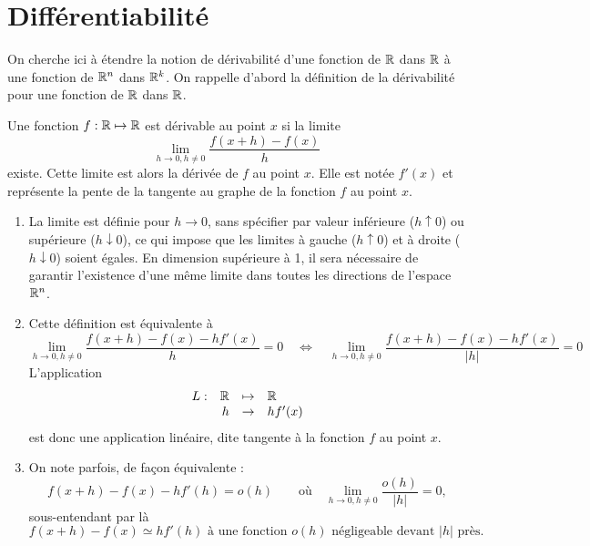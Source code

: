 \section{Différentiabilité} \label{sec:Multivar-Diff}


On cherche ici à étendre la notion de dérivabilité d'une fonction de $\mathbb{R}$ dans $\mathbb{R}$ à une fonction de $\mathbb{R}^n$ dans $\mathbb{R}^k$. On rappelle d'abord la définition de la dérivabilité pour une fonction de $\mathbb{R}$ dans $\mathbb{R}$.

\begin{definition*}[Dérivabilité]
  Une fonction $f: \mathbb{R} \mapsto \mathbb{R}$ est dérivable au point $x$ si la limite
  $$
  \lim_{h \rightarrow 0, h \neq 0} \frac{f(x+h) - f(x)}{h}
  $$
  existe. Cette limite est alors la dérivée de $f$ au point $x$. Elle est notée $f'(x)$ et représente la pente de la tangente au graphe de la fonction $f$ au point $x$.
\end{definition*}

\remark
\begin{enumerate}
  \item La limite est définie pour $h \rightarrow 0$, sans spécifier par valeur inférieure ($h \uparrow 0$) ou supérieure ($h \downarrow 0$), ce qui impose que les limites à gauche ($h \uparrow 0$) et à droite ($h \downarrow 0$) soient égales. En dimension supérieure à 1, il sera nécessaire de garantir l'existence d'une même limite dans toutes les directions de l'espace $\mathbb{R}^n$.
  \item Cette définition est équivalente à
  $$
  \lim_{h\rightarrow 0, h \neq 0} \frac{f(x+h) - f(x) - hf'(x)}{h} = 0
  \quad \Leftrightarrow \quad 
  \lim_{h\rightarrow 0, h \neq 0} \frac{f(x+h) - f(x) - hf'(x)}{|h|} = 0
  $$
  L'application 
  $$
  \begin{array}{rrcl}
    L :  & \mathbb{R} & \mapsto & \mathbb{R} \\
    & h & \rightarrow &  hf'(x)
  \end{array}
  $$
  est donc une application linéaire, dite tangente à la fonction $f$ au point $x$.
  \item On note parfois, de façon équivalente :
  $$
  f(x+h) - f(x) - h f'(h) = o(h)
  \qquad \text{où} \quad
  \lim_{h\rightarrow 0, h \neq 0} \frac{o(h)}{|h|} = 0,
  $$
  sous-entendant par là 
  $$
  \text{$f(x+h) - f(x) \simeq h f'(h)$ à une fonction $o(h)$ négligeable devant $|h|$ près.}
  $$
\end{enumerate}

